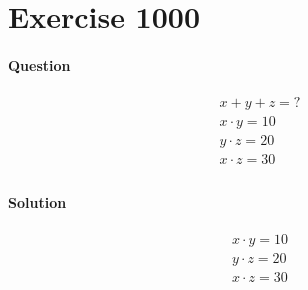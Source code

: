 \documentclass{article}
\begin{document}


\section{Exercise 1000}

\paragraph{Question}
\begin{align*}
	x + y + z = ?  \\
	x \cdot y = 10 \\
	y \cdot z = 20 \\
	x \cdot z = 30 \\
\end{align*}

\paragraph{Solution}
\begin{align*}
	x \cdot y = 10 \\
	y \cdot z = 20 \\
	x \cdot z = 30 \\
\end{align*}

\end{document}
